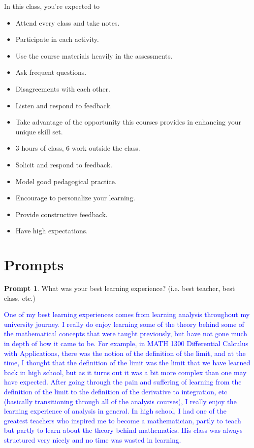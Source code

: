 \documentclass[11pt]{article}
\theoremstyle{theorem}\newtheorem*{task}{Task}
\theoremstyle{theorem}\newtheorem*{example}{Example}
\theoremstyle{definition}\newtheorem*{solution}{Solution}
\theoremstyle{theorem}\newtheorem*{prompt}{Prompt}
\begin{document}
In this class, you're expected to
\begin{itemize}
    \item Attend every class and take notes.
    \item Participate in each activity.
    \item Use the course materials heavily in the assessments.
    \item Ask frequent questions.
    \item Disagreements with each other.
    \item Listen and respond to feedback.
    \item Take advantage of the opportunity this courses provides in enhancing your unique skill set.
    \item 3 hours of class, 6 work outside the class.
    \item Solicit and respond to feedback.
    \item Model good pedagogical practice.
    \item Encourage to personalize your learning.
    \item Provide constructive feedback.
    \item Have high expectations.
\end{itemize}

\section{Prompts}

\begin{prompt}
    What was your best learning experience? (i.e. best teacher, best class, etc.)
\end{prompt}

\textcolor{Blue}{One of my best learning experiences comes from learning analysis throughout my university journey. I really do enjoy learning some of the theory behind some of the mathematical concepts that were taught previously, but have not gone much in depth of how it came to be. For example, in MATH 1300 Differential Calculus with Applications, there was the notion of the definition of the limit, and at the time, I thought that the definition of the limit was the limit that we have learned back in high school, but as it turns out it was a bit more complex than one may have expected. After going through the pain and suffering of learning from the definition of the limit to the definition of the derivative to integration, etc (basically transitioning through all of the analysis courses), I really enjoy the learning experience of analysis in general. In high school, I had one of the greatest teachers who inspired me to become a mathematician, partly to teach but partly to learn about the theory behind mathematics. His class was always structured very nicely and no time was wasted in learning.}
\end{document}
